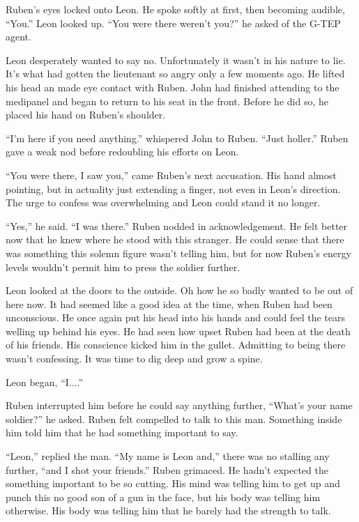 Ruben's eyes locked onto Leon.  He spoke softly at first, then becoming audible, ``You.''  Leon looked up.  ``You were there weren't you?'' he asked of the G-TEP agent.

Leon desperately wanted to say no.  Unfortunately it wasn't in his nature to lie.  It's what had gotten the lieutenant so angry only a few moments ago.  He lifted his head an made eye contact with Ruben.  John had finished attending to the medipanel and began to return to his seat in the front.  Before he did so, he placed his hand on Ruben's shoulder.  

``I'm here if you need anything.'' whispered John to Ruben.  ``Just holler.''  Ruben gave a weak nod before redoubling his efforts on Leon.

``You were there, I saw you,'' came Ruben's next accusation.  His hand almost pointing, but in actuality just extending a finger, not even in Leon's direction.  The urge to confess was overwhelming and Leon could stand it no longer.

``Yes,'' he said.  ``I was there.''  Ruben nodded in acknowledgement.  He felt better now that he knew where he stood with this stranger.  He could sense that there was something this solemn figure wasn't telling him, but for now Ruben's energy levels wouldn't permit him to press the soldier further.

Leon looked at the doors to the outside.  Oh how he so badly wanted to be out of here now.  It had seemed like a good idea at the time, when Ruben had been unconscious.  He once again put his head into his hands and could feel the tears welling up behind his eyes.  He had seen how upset Ruben had been at the death of his friends.  His conscience kicked him in the gullet.  Admitting to being there wasn't confessing.  It was time to dig deep and grow a spine.

Leon began, ``I....''  

Ruben interrupted him before he could say anything further, ``What's your name soldier?'' he asked.  Ruben felt compelled to talk to this man.  Something inside him told him that he had something important to say.  

``Leon,'' replied the man.  ``My name is Leon and,'' there was no stalling any further, ``and I shot your friends.''  Ruben grimaced.  He hadn't expected the something important to be so cutting.  His mind was telling him to get up and punch this no good son of a gun in the face, but his body was telling him otherwise.  His body was telling him that he barely had the strength to talk.

